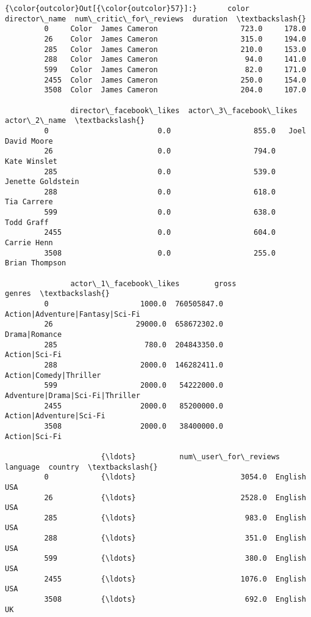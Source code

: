 \documentclass[11pt]{article}
\begin{document}
\begin{Verbatim}[commandchars=\\\{\}]
{\color{outcolor}Out[{\color{outcolor}57}]:}       color  director\_name  num\_critic\_for\_reviews  duration  \textbackslash{}
         0     Color  James Cameron                   723.0     178.0   
         26    Color  James Cameron                   315.0     194.0   
         285   Color  James Cameron                   210.0     153.0   
         288   Color  James Cameron                    94.0     141.0   
         599   Color  James Cameron                    82.0     171.0   
         2455  Color  James Cameron                   250.0     154.0   
         3508  Color  James Cameron                   204.0     107.0   
         
               director\_facebook\_likes  actor\_3\_facebook\_likes       actor\_2\_name  \textbackslash{}
         0                         0.0                   855.0   Joel David Moore   
         26                        0.0                   794.0       Kate Winslet   
         285                       0.0                   539.0  Jenette Goldstein   
         288                       0.0                   618.0        Tia Carrere   
         599                       0.0                   638.0         Todd Graff   
         2455                      0.0                   604.0        Carrie Henn   
         3508                      0.0                   255.0     Brian Thompson   
         
               actor\_1\_facebook\_likes        gross                           genres  \textbackslash{}
         0                     1000.0  760505847.0  Action|Adventure|Fantasy|Sci-Fi   
         26                   29000.0  658672302.0                    Drama|Romance   
         285                    780.0  204843350.0                    Action|Sci-Fi   
         288                   2000.0  146282411.0           Action|Comedy|Thriller   
         599                   2000.0   54222000.0  Adventure|Drama|Sci-Fi|Thriller   
         2455                  2000.0   85200000.0          Action|Adventure|Sci-Fi   
         3508                  2000.0   38400000.0                    Action|Sci-Fi   
         
                      {\ldots}          num\_user\_for\_reviews language  country  \textbackslash{}
         0            {\ldots}                        3054.0  English      USA   
         26           {\ldots}                        2528.0  English      USA   
         285          {\ldots}                         983.0  English      USA   
         288          {\ldots}                         351.0  English      USA   
         599          {\ldots}                         380.0  English      USA   
         2455         {\ldots}                        1076.0  English      USA   
         3508         {\ldots}                         692.0  English       UK   
         

\end{Verbatim}
\end{document}
